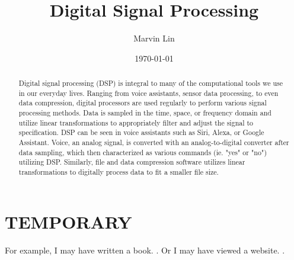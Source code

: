 \documentclass[11pt]{article}
\title{Digital Signal Processing}
\author{Marvin Lin}
\date{\today}
\affil{Portland Community College}
\begin{document}

\maketitle


\begin{abstract}

Digital signal processing (DSP) is integral to many of the computational tools we use in our everyday lives. Ranging from voice assistants, sensor data processing, to even data compression, digital processors are used regularly to perform various signal processing methods. Data is sampled in the time, space, or frequency domain and utilize linear transformations to appropriately filter and adjust the signal to specification. DSP can be seen in voice assistants such as Siri, Alexa, or Google Assistant. Voice, an analog signal, is converted with an analog-to-digital converter after data sampling, which then characterized as various commands (ie. "yes" or "no") utilizing DSP. Similarly, file and data compression software utilizes linear transformations to digitally process data to fit a smaller file size.

\end{abstract}


\section{TEMPORARY}

For example, I may have written a book. \cite{book:author}. Or I may have viewed a website. \cite{website:topic}.



\end{document}
